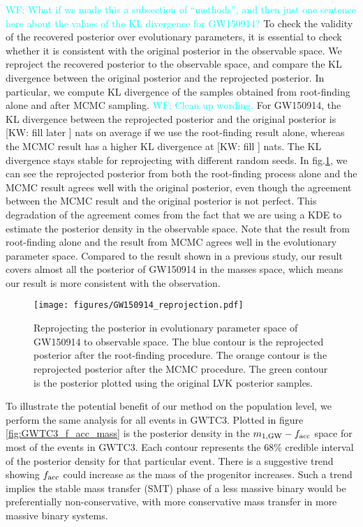 \documentclass[twocolumn]{aastex631}
\newcommand{\kw}[1]{{\color{rb4}[KW: #1 ]}}
\newcommand{\wf}[1]{\textcolor{cyan}{WF: #1}}
\begin{document}
\wf{What if we made this a subsection of ``methods'', and then just one sentence here about the values of the KL divergence for GW150914?}
To check the validity of the recovered posterior over evolutionary parameters,
it is essential to check whether it is consistent with the original posterior in
the observable space. We reproject the recovered posterior to the observable
space, and compare the KL divergence between the original posterior and the
reprojected posterior. In particular, we compute KL divergence of the samples
obtained from root-finding alone and after MCMC sampling. \wf{Clean up wording.}
For GW150914, the KL divergence between the reprojected posterior and the
original posterior is \kw{fill later} nats on average if we use the root-finding
result alone, whereas the MCMC result has a higher KL divergence at \kw{fill}
nats. The KL divergence stays stable for reprojecting with different random
seeds. In fig.\ref{fig:GW150914_reprojection}, we can see the reprojected
posterior from both the root-finding process alone and the MCMC result agrees
well with the original posterior, even though the agreement between the MCMC
result and the original posterior is not perfect. This degradation of the
agreement comes from the fact that we are using a KDE to estimate the posterior
density in the observable space. Note that the result from root-finding alone
and the result from MCMC agrees well in the evolutionary parameter space.
Compared to the result shown in a previous study, our result covers almost all
the posterior of GW150914 in the masses space, which means our result is more
consistent with the observation.


\begin{figure}
\texttt{[image: figures/GW150914\_reprojection.pdf]}
\caption{Reprojecting the posterior in evolutionary parameter space of GW150914 to observable space.
The blue contour is the reprojected posterior after the root-finding procedure.
The orange contour is the reprojected posterior after the MCMC procedure.
The green contour is the posterior plotted using the original LVK posterior samples.
}
\label{fig:GW150914_reprojection}
\end{figure}


To illustrate the potential benefit of our method on the population level, we
perform the same analysis for all events in GWTC3. Plotted in figure
\ref{fig:GWTC3_f_acc_mass} is the posterior density in the $m_{1,{\rm
GW}}-f_{\rm acc}$ space for most of the events in GWTC3. Each contour represents
the $68\%$ credible interval of the posterior density for that particular event.
There is a suggestive trend showing $f_{\rm acc}$ could increase as the mass of
the progenitor increases. Such a trend implies the stable mass transfer (SMT)
phase of a less massive binary would be preferentially non-conservative, with
more conservative mass transfer in more massive binary systems.
\end{document}
